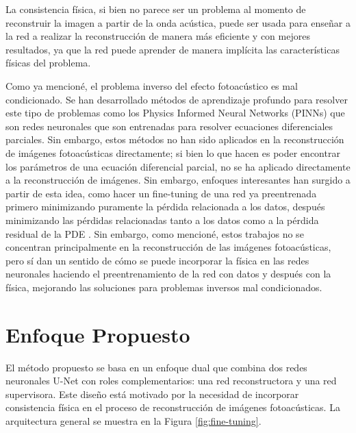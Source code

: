 La consistencia física, si bien no parece ser un problema al momento de reconstruir la imagen a partir de la onda acústica, puede ser usada para enseñar a la red a realizar la reconstrucción de manera más eficiente y con mejores resultados, ya que la red puede aprender de manera implícita las características físicas del problema.

Como ya mencioné, el problema inverso del efecto fotoacústico es mal condicionado. Se han desarrollado métodos de aprendizaje profundo para resolver este tipo de problemas como los Physics Informed Neural Networks (PINNs) \cite{Raissi2017Physics} que son redes neuronales que son entrenadas para resolver ecuaciones diferenciales parciales. Sin embargo, estos métodos no han sido aplicados en la reconstrucción de imágenes fotoacústicas directamente; si bien lo que hacen es poder encontrar los parámetros de una ecuación diferencial parcial, no se ha aplicado directamente a la reconstrucción de imágenes. Sin embargo, enfoques interesantes han surgido a partir de esta idea, como hacer un fine-tuning de una red ya preentrenada primero minimizando puramente la pérdida relacionada a los datos, después minimizando las pérdidas relacionadas tanto a los datos como a la pérdida residual de la PDE \cite{Zhou2024DataGuided}. Sin embargo, como mencioné, estos trabajos no se concentran principalmente en la reconstrucción de las imágenes fotoacústicas, pero sí dan un sentido de cómo se puede incorporar la física en las redes neuronales haciendo el preentrenamiento de la red con datos y después con la física, mejorando las soluciones para problemas inversos mal condicionados.

\section{Enfoque Propuesto}
\label{sec:enfoque}

El método propuesto se basa en un enfoque dual que combina dos redes neuronales U-Net con roles complementarios: una red reconstructora y una red supervisora. Este diseño está motivado por la necesidad de incorporar consistencia física en el proceso de reconstrucción de imágenes fotoacústicas. La arquitectura general se muestra en la Figura \ref{fig:fine-tuning}.


